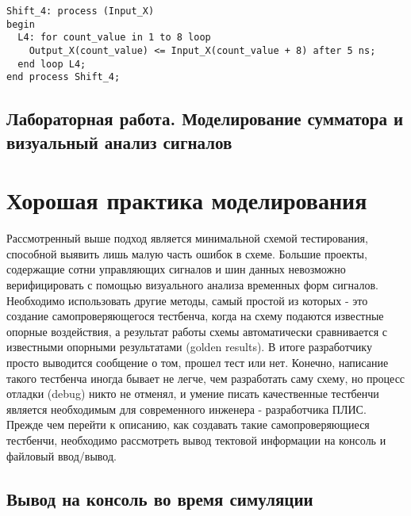 \begin{Code}
\begin{lstlisting}[caption=Цикл For, label=loop_4]
Shift_4: process (Input_X)
begin
  L4: for count_value in 1 to 8 loop
    Output_X(count_value) <= Input_X(count_value + 8) after 5 ns;
  end loop L4;
end process Shift_4;
\end{lstlisting}
\end{Code}


\subsection{Лабораторная работа. Моделирование сумматора и визуальный анализ сигналов}



\section{Хорошая практика моделирования}

Рассмотренный выше подход является минимальной схемой тестирования, способной выявить лишь малую часть ошибок в схеме. Большие проекты, содержащие сотни управляющих сигналов и шин данных невозможно верифицировать с помощью визуального анализа временных форм сигналов. Необходимо использовать другие методы, самый простой из которых - это создание самопроверяющегося тестбенча, когда на схему подаются известные опорные воздействия, а результат работы схемы автоматически сравнивается с известными опорными результатами (golden results). В итоге разработчику просто выводится сообщение о том, прошел тест или нет. Конечно, написание такого тестбенча иногда бывает не легче, чем разработать саму схему, но процесс отладки (debug) никто не отменял, и умение писать качественные тестбенчи является необходимым для современного инженера - разработчика ПЛИС. Прежде чем перейти к описанию, как создавать такие самопроверяющиеся тестбенчи, необходимо рассмотреть вывод тектовой информации на консоль и файловый ввод/вывод.

\subsection{Вывод на консоль во время симуляции}

